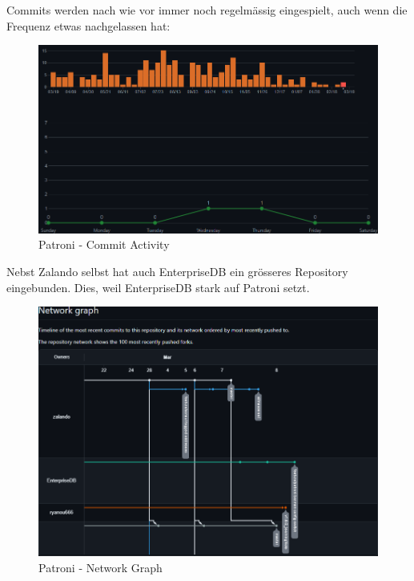 \begin{flushleft}
    Commits werden nach wie vor immer noch regelmässig eingespielt, auch wenn die Frequenz etwas nachgelassen hat:
    \begin{figure}[H]
        \centering
        \includegraphics[width=0.75\linewidth]{source/implementation/evaluation/postgresql_ha_solutions/insights/patroni/commit_activity_zalando_patroni}
        \caption{Patroni - Commit Activity}
        \label{fig:commit_activity_zalando_patroni}
    \end{figure}
\end{flushleft}
\clearpage
\begin{flushleft}
    Nebst Zalando selbst hat auch EnterpriseDB\cite{RUE8EPJ4} ein grösseres Repository eingebunden.
    Dies, weil EnterpriseDB stark auf Patroni setzt.
     \begin{figure}[H]
        \centering
        \includegraphics[width=0.75\linewidth]{source/implementation/evaluation/postgresql_ha_solutions/insights/patroni/networkgraph_zalando_patroni}
        \caption{Patroni - Network Graph}
        \label{fig:networkgraph_zalando_patroni}
    \end{figure}
\end{flushleft}